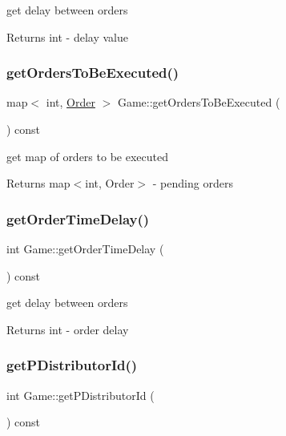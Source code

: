get delay between orders \begin{DoxyReturn}{Returns}
int -\/ delay value 
\end{DoxyReturn}
\mbox{\label{classGame_a7bb6c8a67ab9e3c0eb9b6c8892ce4084}} 
\subsubsection{\texorpdfstring{get\+Orders\+To\+Be\+Executed()}{getOrdersToBeExecuted()}}
{\footnotesize\ttfamily map$<$ int, \hyperlink{classOrder}{Order} $>$ Game\+::get\+Orders\+To\+Be\+Executed (\begin{DoxyParamCaption}{ }\end{DoxyParamCaption}) const}

get map of orders to be executed \begin{DoxyReturn}{Returns}
map$<$int, Order$>$ -\/ pending orders 
\end{DoxyReturn}
\mbox{\label{classGame_ac33e4608fc0971b4280ab16fb7dafde4}} 
\subsubsection{\texorpdfstring{get\+Order\+Time\+Delay()}{getOrderTimeDelay()}}
{\footnotesize\ttfamily int Game\+::get\+Order\+Time\+Delay (\begin{DoxyParamCaption}{ }\end{DoxyParamCaption}) const}

get delay between orders \begin{DoxyReturn}{Returns}
int -\/ order delay 
\end{DoxyReturn}
\mbox{\label{classGame_adfa63d3dd6455a8ba8530baf322c70c4}} 
\subsubsection{\texorpdfstring{get\+P\+Distributor\+Id()}{getPDistributorId()}}
{\footnotesize\ttfamily int Game\+::get\+P\+Distributor\+Id (\begin{DoxyParamCaption}{ }\end{DoxyParamCaption}) const}


